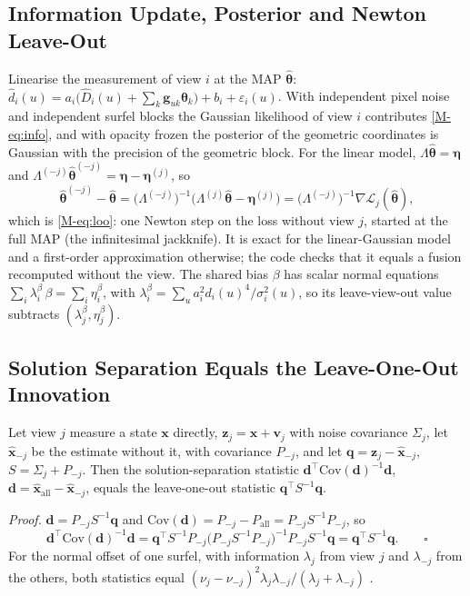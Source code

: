 \subsection{Information Update, Posterior and Newton Leave-Out}
Linearise the measurement of view $i$ at the MAP $\hat{\boldsymbol\theta}$: $\hat d_i(u)=a_i\bigl(\hat D_i(u)+\sum_k
\mathbf{g}_{uk}\boldsymbol\theta_k\bigr)+b_i+\varepsilon_i(u)$. With independent pixel noise and independent
surfel blocks the Gaussian likelihood of view $i$ contributes \eqref{M-eq:info}, and with opacity frozen the
posterior of the geometric coordinates is Gaussian with the precision of the geometric block. For the
linear model, $\Lambda\hat{\boldsymbol\theta}=\boldsymbol\eta$ and
$\Lambda^{(-j)}\hat{\boldsymbol\theta}^{(-j)}=\boldsymbol\eta-\boldsymbol\eta^{(j)}$, so
\[
\hat{\boldsymbol\theta}^{(-j)}-\hat{\boldsymbol\theta}=\bigl(\Lambda^{(-j)}\bigr)^{-1}\bigl(\Lambda^{(j)}\hat{\boldsymbol\theta}-\boldsymbol\eta^{(j)}\bigr)
=\bigl(\Lambda^{(-j)}\bigr)^{-1}\nabla\mathcal{L}_j(\hat{\boldsymbol\theta}),
\]
which is \eqref{M-eq:loo}: one Newton step on the loss without view $j$, started at the full MAP (the
infinitesimal jackknife). It is exact for the linear-Gaussian model and a first-order approximation
otherwise; the code checks that it equals a fusion recomputed without the view. The shared bias $\beta$
has scalar normal equations $\sum_i\lambda^{\beta}_i\,\beta=\sum_i\eta^{\beta}_i$, with $\lambda^{\beta}_i=\sum_u a_i^{2}d_i(u)^{4}/\sigma_i^{2}(u)$, so its leave-view-out value subtracts
$(\lambda^{\beta}_j,\eta^{\beta}_j)$.

\subsection{Solution Separation Equals the Leave-One-Out Innovation}
\begin{proposition}
\label{prop:loo}
Let view $j$ measure a state $\mathbf{x}$ directly, $\mathbf{z}_j=\mathbf{x}+\mathbf{v}_j$ with noise covariance
$\Sigma_j$, let $\hat{\mathbf{x}}_{-j}$ be the estimate without it, with covariance $P_{-j}$, and let
$\mathbf{q}=\mathbf{z}_j-\hat{\mathbf{x}}_{-j}$, $S=\Sigma_j+P_{-j}$. Then the solution-separation statistic
$\mathbf{d}^{\top}\mathrm{Cov}(\mathbf{d})^{-1}\mathbf{d}$, $\mathbf{d}=\hat{\mathbf{x}}_{\mathrm{all}}-\hat{\mathbf{x}}_{-j}$, equals the
leave-one-out statistic $\mathbf{q}^{\top}S^{-1}\mathbf{q}$.
\end{proposition}
\emph{Proof.} $\mathbf{d}=P_{-j}S^{-1}\mathbf{q}$ and $\mathrm{Cov}(\mathbf{d})=P_{-j}-P_{\mathrm{all}}=P_{-j}S^{-1}P_{-j}$, so
\[
\mathbf{d}^{\top}\mathrm{Cov}(\mathbf{d})^{-1}\mathbf{d}
=\mathbf{q}^{\top}S^{-1}P_{-j}\bigl(P_{-j}S^{-1}P_{-j}\bigr)^{-1}P_{-j}S^{-1}\mathbf{q}
=\mathbf{q}^{\top}S^{-1}\mathbf{q}.\qquad\square
\]
For the normal offset of one surfel, with information $\lambda_j$ from view $j$ and $\lambda_{-j}$ from the
others, both statistics equal $(\nu_j-\nu_{-j})^{2}\lambda_j\lambda_{-j}/(\lambda_j+\lambda_{-j})$
\cite{flt_raim_joerger}.

